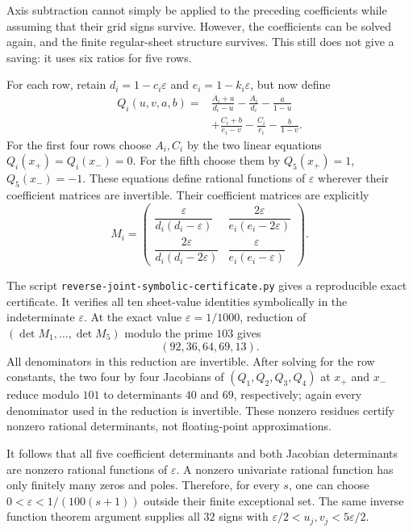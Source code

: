 \documentclass[11pt]{article}
\begin{document}
Axis subtraction cannot simply be applied to the preceding coefficients
while assuming that their grid signs survive. However, the coefficients
can be solved again, and the finite regular-sheet structure survives.
This still does not give a saving: it uses six ratios for five rows.

For each row, retain $d_i=1-c_i\varepsilon$ and
$e_i=1-k_i\varepsilon$, but now define
\[
\begin{split}
 Q_i(u,v,a,b)={}&\frac{A_i+a}{d_i-u}-\frac{A_i}{d_i}
                    -\frac{a}{1-u}\\
              &+\frac{C_i+b}{e_i-v}-\frac{C_i}{e_i}
                    -\frac{b}{1-v}.
\end{split}
\]
For the first four rows choose $A_i,C_i$ by the two linear equations
$Q_i(x_+)=Q_i(x_-)=0$. For the fifth choose them by
$Q_5(x_+)=1$, $Q_5(x_-)=-1$. These equations define rational functions
of $\varepsilon$ wherever their coefficient matrices are invertible.
Their coefficient matrices are explicitly
\[
 M_i=\begin{pmatrix}
 \dfrac{\varepsilon}{d_i(d_i-\varepsilon)}&
 \dfrac{2\varepsilon}{e_i(e_i-2\varepsilon)}\\
 \dfrac{2\varepsilon}{d_i(d_i-2\varepsilon)}&
 \dfrac{\varepsilon}{e_i(e_i-\varepsilon)}
 \end{pmatrix}.
\]

The script \texttt{reverse-joint-symbolic-certificate.py} gives a
reproducible exact certificate. It verifies all ten sheet-value
identities symbolically in the indeterminate $\varepsilon$. At the
exact value $\varepsilon=1/1000$, reduction of
$(\det M_1,\ldots,\det M_5)$ modulo the prime $103$ gives
\[
 (92,36,64,69,13).
\]
All denominators in this reduction are invertible. After solving for
the row constants, the two four by four Jacobians of
$(Q_1,Q_2,Q_3,Q_4)$ at $x_+$ and $x_-$ reduce modulo $101$ to
determinants $40$ and $69$, respectively; again every denominator
used in the reduction is invertible. These nonzero residues certify
nonzero rational determinants, not floating-point approximations.

It follows that all five coefficient determinants and both Jacobian
determinants are nonzero rational functions of $\varepsilon$. A
nonzero univariate rational function has only finitely many zeros and
poles. Therefore, for every $s$, one can choose
$0<\varepsilon<1/(100(s+1))$ outside their finite exceptional set.
The same inverse function theorem argument supplies all $32$ signs
with $\varepsilon/2<u_j,v_j<5\varepsilon/2$.
\end{document}

